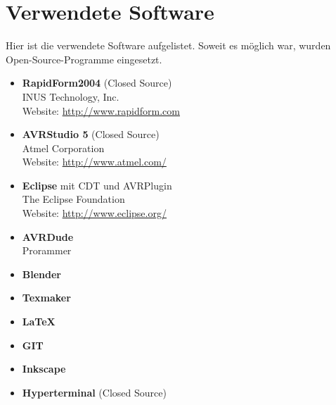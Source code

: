 \section{Verwendete Software}
\label{sec:V_Software}
Hier ist die verwendete Software aufgelistet. Soweit es möglich war, wurden Open-Source-Programme eingesetzt.
\begin{itemize}
\item \textbf{RapidForm2004} (Closed Source)\\
INUS Technology, Inc.\\
Website: \url{http://www.rapidform.com}
\item \textbf{AVRStudio 5}  (Closed Source)\\
Atmel Corporation \\
Website: \url{http://www.atmel.com/}  
\item \textbf{Eclipse} mit CDT und AVRPlugin\\
The Eclipse Foundation\\
Website: \url{http://www.eclipse.org/}  
\item \textbf{AVRDude} \\
Prorammer \\
\item \textbf{Blender}\\
\item \textbf{Texmaker}\\
\item \textbf{LaTeX}\\
\item \textbf{GIT}\\
\item \textbf{Inkscape}\\
\item \textbf{Hyperterminal} (Closed Source)\\

\end{itemize}

\\